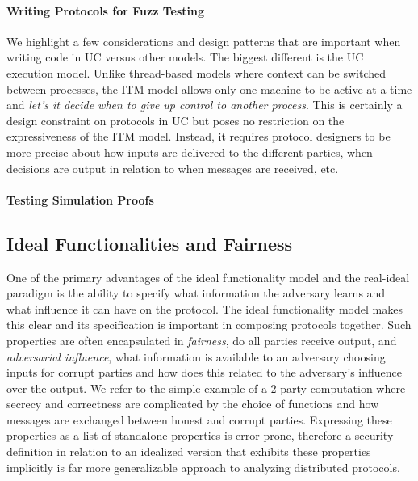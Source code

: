\paragraph{Writing Protocols for Fuzz Testing}
We highlight a few considerations and design patterns that are important when writing code in UC versus other models.
The biggest different is the UC execution model. 
Unlike thread-based models where context can be switched between processes, the ITM model allows only one machine to be active at a time and \emph{let's it decide when to give up control to another process}.
This is certainly a design constraint on protocols in UC but poses no restriction on the expressiveness of the ITM model.
Instead, it requires protocol designers to be more precise about how inputs are delivered to the different parties, when decisions are output in relation to when messages are received, etc. 



\paragraph{Testing Simulation Proofs}
\todo{}

\subsection{Ideal Functionalities and Fairness}
One of the primary advantages of the ideal functionality model and the real-ideal paradigm is the ability to specify what information the adversary learns and what influence it can have on the protocol.
The ideal functionality model makes this clear and its specification is important in composing protocols together.
Such properties are often encapsulated in \emph{fairness}, do all parties receive output, and \emph{adversarial influence}, what information is available to an adversary choosing inputs for corrupt parties and how does this related to the adversary's influence over the output.
We refer to the simple example of a 2-party computation where secrecy and correctness are complicated by the choice of functions and how messages are exchanged between honest and corrupt parties.
Expressing these properties as a list of standalone properties is error-prone, therefore a security definition in relation to an idealized version that exhibits these properties implicitly is far more generalizable approach to analyzing distributed protocols. 

